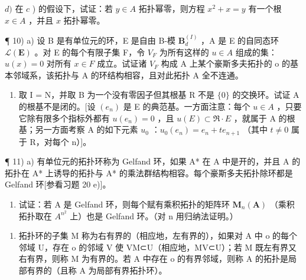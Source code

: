 \(d)\) 在 \(c\) ) 的假设下，试证：若 \(y \in A\) 拓扑幂零，则方程 \(x^{2} + x = y\) 有一个根 \(x \in A\) ，并且 \(x\) 拓扑幂零。

¶ 10) a) 设 B 是有单位元的环，E 是自由 B-模 \(\mathbf{B}_{d}^{(I)}\) ，A 是 E 的自同态环 \(\mathcal{L}(\mathbf{E})\) 。对 E 的每个有限子集 F，令 \(V_{F}\) 为所有这样的 \(u \in A\) 组成的集：\(u(x) = 0\) 对所有 \(x \in F\) 成立。试证诸 \(V_{F}\) 构成 A 上某个豪斯多夫拓扑的 o 的基本邻域系，该拓扑与 A 的环结构相容，且对此拓扑 A 全不连通。

\begin{enumerate}
\def\labelenumi{\alph{enumi})}
\setcounter{enumi}{1}
\tightlist
\item
  取 I = N，并取 B 为一个没有零因子但其根基 R 不是 \(\{0\}\) 的交换环。试证 A 的根基不是闭的。{[}设 \((e_{n})\) 是 E 的典范基。一方面注意：每个 \(u \in A\) ，只要它除有限多个指标外都有 \(u(e_{n}) = 0\) ，且 \(u(E) \subset \Re \cdot E\) ，就属于 A 的根基；另一方面考察 A 的如下元素 \(u_{0}\) ：\(u_{0}(e_{n}) = e_{n} + te_{n+1}\) （其中 \(t \neq 0\) 属于 R，对每个 n）{]}。
\end{enumerate}

¶ 11) a) 有单位元的拓扑环称为 Gelfand 环，如果 A* 在 A 中是开的，并且 A 的拓扑在 A* 上诱导的拓扑与 A* 的乘法群结构相容。每个豪斯多夫拓扑除环都是 Gelfand 环{[}参看习题 20 e){]}。

\begin{enumerate}
\def\labelenumi{\alph{enumi})}
\setcounter{enumi}{1}
\tightlist
\item
  试证：若 A 是 Gelfand 环，则每个赋有乘积拓扑的矩阵环 \(\mathbf{M}_{n}(\mathbf{A})\) （乘积拓扑取在 \(A^{n^{2}}\) 上）也是 Gelfand 环。（对 n 用归纳法证明。）
\end{enumerate}

\begin{enumerate}
\def\labelenumi{\arabic{enumi})}
\setcounter{enumi}{11}
\tightlist
\item
  拓扑环的子集 M 称为右有界的（相应地，左有界的），如果对 A 中 o 的每个邻域 U，存在 o 的邻域 V 使 VM⊂U（相应地，MV⊂U）；若 M 既左有界又右有界，则称 M 为有界的。若 A 中存在 o 的有界邻域，则称 A 的拓扑是局部有界的（且称 A 为局部有界拓扑环）。
\end{enumerate}

